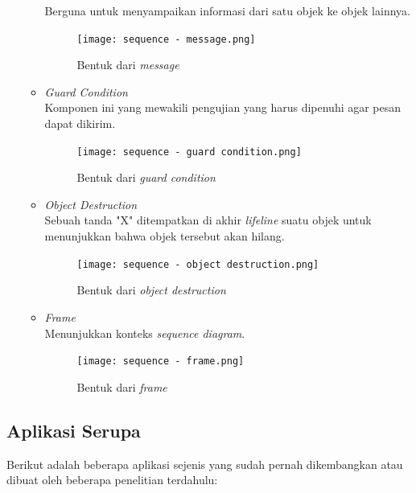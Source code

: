 \documentclass[a4paper]{article}
\newcommand{\subbab}[1]{%
    \subsection{#1}%
    \setcounter{figure}{0}
    \setcounter{table}{0}
}
\begin{document}
\begin{enumerate}
\begin{itemize}
        Berguna untuk menyampaikan informasi dari satu objek ke objek lainnya\autocite{systemanalysisdesign-sequence-diagram}.
        \begin{figure}[h]
            \centering
            \texttt{[image: sequence - message.png]}
            \caption{Bentuk dari \textit{message}}
        \end{figure}
        \item \textit{Guard Condition}\\
        Komponen ini yang mewakili pengujian yang harus dipenuhi agar pesan dapat dikirim\autocite{systemanalysisdesign-sequence-diagram}.
        \begin{figure}[h]
            \centering
            \texttt{[image: sequence - guard condition.png]}
            \caption{Bentuk dari \textit{guard condition}}
        \end{figure}
        \newpage
        \item \textit{Object Destruction}\\
        Sebuah tanda "X" ditempatkan di akhir \textit{lifeline} suatu objek untuk menunjukkan bahwa objek tersebut akan hilang\autocite{systemanalysisdesign-sequence-diagram}.
        \begin{figure}[h]
            \centering
            \texttt{[image: sequence - object destruction.png]}
            \caption{Bentuk dari \textit{object destruction}}
        \end{figure}
        \item \textit{Frame}\\
        Menunjukkan konteks \textit{sequence diagram}\autocite{systemanalysisdesign-sequence-diagram}.
        \begin{figure}[h]
            \centering
            \texttt{[image: sequence - frame.png]}
            \caption{Bentuk dari \textit{frame}}
        \end{figure}
    \end{itemize}
\end{enumerate}
\subbab{Aplikasi Serupa}
Berikut adalah beberapa aplikasi sejenis yang sudah pernah dikembangkan atau dibuat oleh beberapa penelitian terdahulu:
\end{document}
